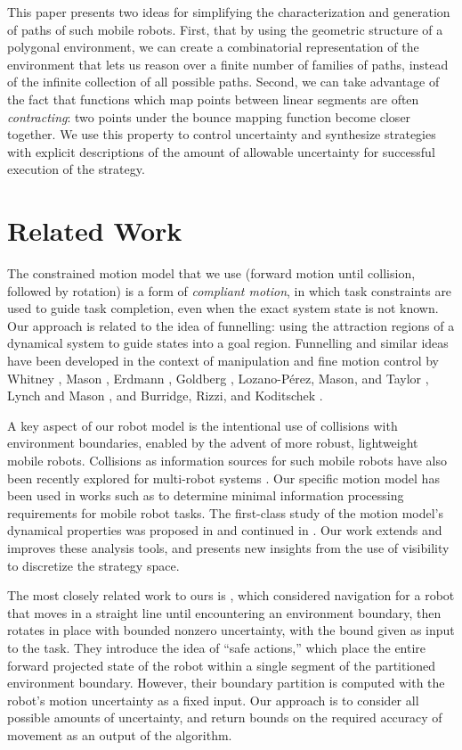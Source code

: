 \documentclass[]{styles/svproc}  %
\begin{document}
This paper presents two ideas for simplifying the characterization and
generation of paths of such mobile robots.  First, that by using the geometric
structure of a polygonal environment, we can create a combinatorial
representation of the environment that lets us reason over a finite number of
families of paths, instead of the infinite collection of all possible paths.
Second, we can take advantage of the fact that functions which map points
between linear segments are often \emph{contracting}: two points under the
bounce mapping function become closer together.  We use this property to
control uncertainty and synthesize strategies with explicit descriptions of the
amount of allowable uncertainty for successful execution of the strategy.


\section{Related Work}

The constrained motion model that we use (forward motion until collision,
followed by rotation) is a
form of \emph{compliant motion}, in which task constraints are used to guide task
completion, even when the exact system state is not known. Our approach is
related to the idea of funnelling: using
the attraction regions of a dynamical system to guide states into a goal region.
Funnelling and similar ideas have been developed in the context of manipulation and fine motion control by Whitney
\cite{Whi77}, Mason \cite{Mas85}, Erdmann
\cite{Erd86}, Goldberg \cite{Gol93}, Lozano-P{\'e}rez, Mason, and Taylor
\cite{LozMasTay84}, Lynch and Mason \cite{LynMas95}, and Burridge, Rizzi, and Koditschek \cite{BurRizKod99}.


A key aspect of our robot model is the intentional use of collisions with
environment boundaries, enabled by the advent of more robust, lightweight mobile
robots. Collisions as information sources for such mobile robots have also been
recently explored for multi-robot systems \cite{mayya2017collisions}. Our
specific motion model has been used in works such as \cite{OkaLav06} to
determine minimal information processing requirements for mobile robot tasks.
The first-class study of the motion model's dynamical properties was proposed in
\cite{ErLav13} and continued in \cite{NilBecLav17}. Our work extends and improves
these analysis tools, and presents new insights from the use of visibility to
discretize the strategy space.

The most closely related work to ours is \cite{LewOKa13}, which considered
navigation for a robot that moves in a straight line until encountering an
environment boundary, then rotates in place with bounded nonzero
uncertainty, with the bound given as input to the task. 
They introduce the idea of ``safe actions,'' which place the entire forward
projected state of the robot within a single segment of the partitioned
environment boundary. However, their boundary partition is computed with the robot's 
motion uncertainty as a fixed input. Our approach
is to consider all possible amounts of uncertainty, and return bounds on the required
accuracy of movement as an output of the algorithm.
\end{document}
